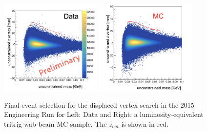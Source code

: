 \begin{figure}
    \centering
    \includegraphics[width=0.45\textwidth]{figs/selection/data_final_2015.png}
    \includegraphics[width=0.45\textwidth]{figs/selection/mc_final_2015.png}
    \caption{Final event selection for the displaced vertex search in the 2015 Engineering Run for Left: Data and Right: a luminosity-equivalent tritrig-wab-beam MC sample. The $z_{cut}$ is shown in red.}
    \label{fig:2015eventselection}
\end{figure}

